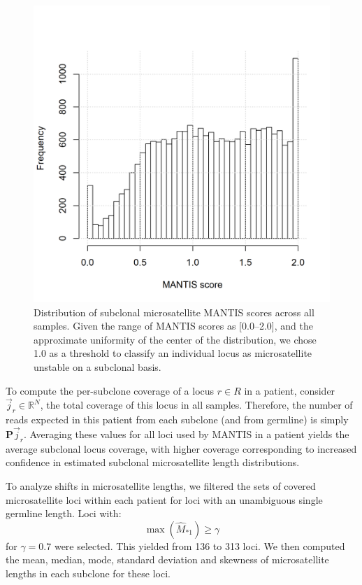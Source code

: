 \begin{figure}[ht]
	\centering
	\includegraphics[width=0.7\linewidth]{images/msiclones/all_subclonal_ms_hist}
	\vspace{-0.5cm}
	\caption[Distribution of subclonal microsatellite MANTIS scores across all samples.]{Distribution of subclonal microsatellite MANTIS scores across all samples. Given the range of MANTIS scores as [0.0--2.0], and the approximate uniformity of the center of the distribution, we chose 1.0 as a threshold to classify an individual locus as microsatellite unstable on a subclonal basis.}
	\label{fig:msiclones:subclonal_ms_hist}
\end{figure}

To compute the per-subclone coverage of a locus $r \in R$ in a patient, consider $\vec{j}_r \in \mathbb{R}^N$, the total coverage of this locus in all samples. Therefore, the number of reads expected in this patient from each subclone (and from germline) is simply $\mathbf{P}\vec{j}_r$. Averaging these values for all loci used by MANTIS in a patient yields the average subclonal locus coverage, with higher coverage corresponding to increased confidence in estimated subclonal microsatellite length distributions.

To analyze shifts in microsatellite lengths, we filtered the sets of covered microsatellite loci within each patient for loci with an unambiguous single germline length. Loci with:
\begin{equation}
	\max(\hat{M}_{*1}) \ge \gamma
	\label{eqn:msiclones:gm_loci}
\end{equation}
for $\gamma = 0.7$ were selected. This yielded from 136 to 313 loci. We then computed the mean, median, mode, standard deviation and skewness of microsatellite lengths in each subclone for these loci.

